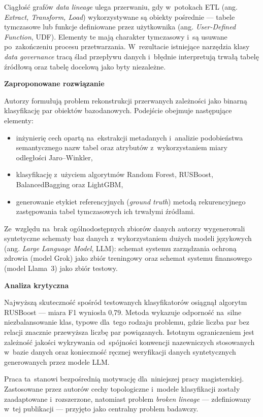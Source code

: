 \documentclass[polish,master,a4paper,oneside]{ppfcmthesis}
\begin{document}
Ciągłość grafów \emph{data lineage} ulega przerwaniu, gdy w~potokach ETL
(ang. \emph{Extract, Transform, Load}) wykorzystywane są obiekty pośrednie
— tabele tymczasowe lub funkcje definiowane przez użytkownika (ang.
\emph{User-Defined Function}, UDF). Elementy te mają charakter tymczasowy
i~są usuwane po~zakończeniu procesu przetwarzania. W~rezultacie istniejące
narzędzia klasy \emph{data governance} tracą ślad przepływu danych
i~błędnie interpretują trwałą tabelę źródłową oraz tabelę docelową jako
byty niezależne.

\noindent\textbf{Zaproponowane rozwiązanie}

Autorzy formułują problem rekonstrukcji przerwanych zależności jako binarną
klasyfikację par obiektów bazodanowych. Podejście obejmuje następujące
elementy:

\begin{itemize}
  \item inżynierię cech opartą na~ekstrakcji metadanych i~analizie
        podobieństwa semantycznego nazw tabel oraz atrybutów
        z~wykorzystaniem miary odległości Jaro--Winkler,
  \item klasyfikację z~użyciem algorytmów Random Forest, RUSBoost,
        BalancedBagging oraz LightGBM,
  \item generowanie etykiet referencyjnych (\emph{ground truth}) metodą
        rekurencyjnego zastępowania tabel tymczasowych ich trwałymi
        źródłami.
\end{itemize}

Ze~względu na~brak ogólnodostępnych zbiorów danych autorzy wygenerowali
syntetyczne schematy baz danych z~wykorzystaniem dużych modeli językowych
(ang. \emph{Large Language Model}, LLM): schemat systemu zarządzania
ochroną zdrowia (model Grok) jako zbiór treningowy oraz schemat systemu
finansowego (model Llama~3) jako zbiór testowy.

\noindent\textbf{Analiza krytyczna}

Najwyższą skuteczność spośród testowanych klasyfikatorów osiągnął algorytm
RUSBoost — miara F1 wyniosła 0{,}79. Metoda wykazuje odporność na~silne
niezbalansowanie klas, typowe dla~tego rodzaju problemu, gdzie liczba par
bez relacji znacznie przewyższa liczbę par powiązanych. Istotnym
ograniczeniem jest zależność jakości wykrywania od~spójności konwencji
nazewniczych stosowanych w~bazie danych oraz konieczność ręcznej weryfikacji
danych syntetycznych generowanych przez modele LLM.

Praca ta~stanowi bezpośrednią motywację dla~niniejszej pracy magisterskiej.
Zastosowane przez autorów cechy topologiczne i~modele klasyfikacji zostały
zaadaptowane i~rozszerzone, natomiast problem \emph{broken lineage} —
zdefiniowany w~tej publikacji — przyjęto jako centralny problem badawczy.
\end{document}
